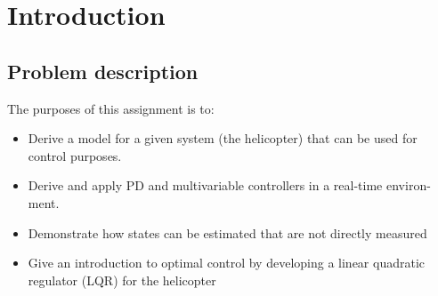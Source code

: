 \section{Introduction}
\subsection{Problem description}

The purposes of this assignment is to:
\begin{itemize}
    \item Derive  a  model  for  a  given  system  (the  helicopter)  that  can  be  used  for
control purposes.
    \item Derive and apply  PD and multivariable controllers in a  real-time environ-
ment.
    \item Demonstrate how states can be estimated that are not directly measured
    \item Give  an  introduction  to  optimal  control  by  developing  a  linear  quadratic
regulator (LQR) for the helicopter \cite{oppgavetekst}
\end{itemize}